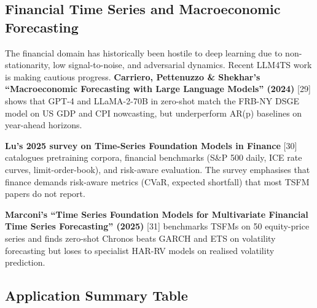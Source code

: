 \documentclass{article}
\begin{document}
\subsection{Financial Time Series and Macroeconomic Forecasting}\label{financial-time-series-and-macroeconomic-forecasting}

The financial domain has historically been hostile to deep learning due to non-stationarity, low signal-to-noise, and adversarial dynamics. Recent LLM4TS work is making cautious progress. \textbf{Carriero, Pettenuzzo \& Shekhar's ``Macroeconomic Forecasting with Large Language Models'' (2024)} {[}29{]} shows that GPT-4 and LLaMA-2-70B in zero-shot match the FRB-NY DSGE model on US GDP and CPI nowcasting, but underperform AR(p) baselines on year-ahead horizons.

\textbf{Lu's 2025 survey on Time-Series Foundation Models in Finance} {[}30{]} catalogues pretraining corpora, financial benchmarks (S\&P 500 daily, ICE rate curves, limit-order-book), and risk-aware evaluation. The survey emphasises that finance demands risk-aware metrics (CVaR, expected shortfall) that most TSFM papers do not report.

\textbf{Marconi's ``Time Series Foundation Models for Multivariate Financial Time Series Forecasting'' (2025)} {[}31{]} benchmarks TSFMs on 50 equity-price series and finds zero-shot Chronos beats GARCH and ETS on volatility forecasting but loses to specialist HAR-RV models on realised volatility prediction.

\subsection{Application Summary Table}\label{application-summary-table}
\end{document}
